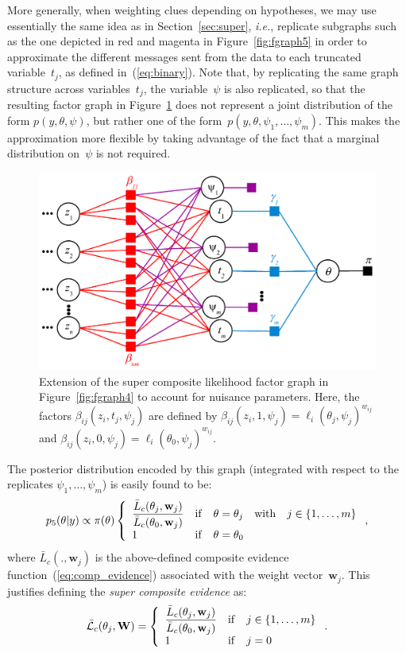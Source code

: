 \documentclass[english]{scrartcl}
\begin{document}
More generally, when weighting clues depending on hypotheses, we may use essentially the same idea as in Section~\ref{sec:super}, {\em i.e.}, replicate subgraphs such as the one depicted in red and magenta in Figure~\ref{fig:fgraph5} in order to approximate the different messages sent from the data to each truncated variable~$t_j$, as defined in~(\ref{eq:binary}). Note that, by replicating the same graph structure across variables~$t_j$, the variable~$\psi$ is also replicated, so that the resulting factor graph in Figure~\ref{fig:fgraph6} does not represent a joint distribution of the form $p(y,\theta,\psi)$, but rather one of the form~$p(y,\theta,\psi_1,\ldots,\psi_m)$. This makes the approximation more flexible by taking advantage of the fact that a marginal distribution on~$\psi$ is not required.

\begin{figure}[!ht]
  \begin{center}
    \includegraphics[width=.7\textwidth]{fgraph6.pdf}
  \end{center}
\caption{Extension of the super composite likelihood factor graph in Figure~\ref{fig:fgraph4} to account for nuisance parameters. Here, the factors $\beta_{ij}(z_i,t_j,\psi_j)$ are defined by $\beta_{ij}(z_i,1,\psi_j)=\ell_i(\theta_j,\psi_j)^{w_{ij}}$ and $\beta_{ij}(z_i,0,\psi_j)=\ell_i(\theta_0,\psi_j)^{w_{ij}}$.}
\label{fig:fgraph6}
\end{figure}

The posterior distribution encoded by this graph (integrated with respect to the replicates $\psi_1,\ldots,\psi_m$) is easily found to be:
$$
p_5(\theta|y)
\propto
\pi(\theta)
\left\{
\begin{array}{lll}
\displaystyle
\frac{\bar{L}_c(\theta_j,\mathbf{w}_j)}{\bar{L}_c(\theta_0,\mathbf{w}_j)} & {\rm if} & \theta=\theta_j \quad {\rm with} \quad j\in\{1,\ldots,m\}\\
1 & {\rm if} & \theta=\theta_0
\end{array}
\right.
,
$$
where $\bar{L}_c(.,\mathbf{w}_j)$ is the above-defined composite evidence function~(\ref{eq:comp_evidence}) associated with the weight vector~$\mathbf{w}_j$. This justifies defining the {\em super composite evidence} as:
\begin{equation}
\label{eq:super_comp_evidence}
\bar{\cal L}_c(\theta_j,\mathbf{W}) = 
\left\{
\begin{array}{lll}
\displaystyle
\frac{\bar{L}_c(\theta_j,\mathbf{w}_j)}{\bar{L}_c(\theta_0,\mathbf{w}_j)} & {\rm if} & j\in\{1,\ldots,m\}\\
1 & {\rm if} & j=0
\end{array}
\right.
.
\end{equation}
\end{document}
